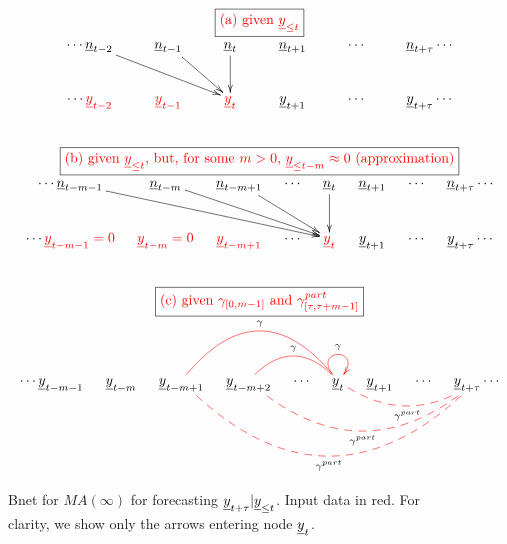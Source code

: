 \newcommand{\gammaEXACT}[0]
{given $\gamma_{[0,m-1]}$
and $\gamma^{part}_{[\tau,\tau+ m-1]}$}


\begin{figure}[h!]
$$
\begin{array}{c}
\fbox{\text{\color{red}(a) \yLt}}
\\
\xymatrix{
\cdots
\rvn_{t-2}\ar[drr]
&\rvn_{t-1}\ar[dr]
&\rvn_t\ar[d]
&\rvn_{t+1}
&\cdots
&\rvn_{t+\tau}
\cdots
\\
\cdots
{\color{red}\rvy_{t-2}}
&{\color{red}\rvy_{t-1}}
&{\color{red}\rvy_t}
&\rvy_{t+1}
&\cdots
&\rvy_{t+\tau}
\cdots
}
\\
\\
\\
\fbox{\text{\color{red}(b) \ynAPPROX}}
\\
\xymatrix@C=10px{
\cdots
\rvn_{t-m-1}\ar[drrrr]
&\rvn_{t-m}\ar[drrr]
&\rvn_{t-m+1}\ar[drr]
&\cdots
&\rvn_{t}\ar[d]
&\rvn_{t+1}
&\cdots
&\rvn_{t+\tau}
\cdots
\\
\cdots
{\color{red}\rvy_{t-m-1}=0}
&{\color{red}\rvy_{t-m}=0}
&{\color{red}\rvy_{t-m+1}}
&\cdots
&{\color{red}\rvy_{t}}
&\rvy_{t+1}
&\cdots
&\rvy_{t+\tau}
\cdots
}
\\
\\
\\
\fbox{\color{red}(c) \gammaEXACT}
\\
\xymatrix@C=10px{
\cdots
\rvy_{t-m-1}
&\rvy_{t-m}
&\rvy_{t-m+1}
&\rvy_{t-m+2}
&\cdots
&\rvy_{t}\ar@[red]@/_3pc/@{-}[lll]_\gamma
\ar@[red]@/_1.5pc/@{-}[ll]_\gamma
\ar@[red]@(ul,ur)[]^\gamma
&\rvy_{t+1}
&\cdots
&\rvy_{t+\tau}
\ar@[red]@/^1.5pc/@{--}[lll]^{\gamma^{part}}
\ar@[red]@/^3pc/@{--}[lllll]^{\gamma^{part}}
\ar@[red]@/^4.5pc/@{--}[llllll]^{\gamma^{part}}
\cdots
}
\end{array}
$$
\caption{Bnet for
$MA(\infty)$
for forecasting
$\rvy_{t+\tau}|\rvy_{\leq t}$.
Input data in red.
For clarity, we show
 only the arrows entering
node $\rvy_t$.}
\label{fig-forecasting-cases}
\end{figure}

